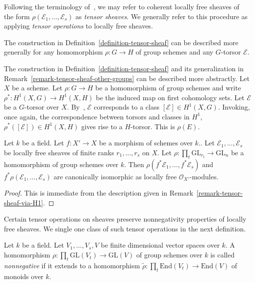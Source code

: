 Following the terminology of~\cite[p.76]{hartshorne_ample_vb}, we may refer to
coherent locally free sheaves of the form
$\rho(\mathcal{E}_1,\ldots,\mathcal{E}_s)$ as \emph{tensor sheaves}.
We generally refer to this procedure as applying \emph{tensor operations}
to locally free sheaves.

\begin{remark}
\label{remark-tensor-sheaf-other-groups}
The construction in Definition~\ref{definition-tensor-sheaf} can be described
more generally for any homomorphism $\rho : G \to H$ of group schemes
and any $G$-torsor $\mathcal{E}$.
\end{remark}

\begin{remark}
\label{remark-tensor-sheaf-via-H1}
The construction in Definition~\ref{definition-tensor-sheaf} and its
generalization in Remark~\ref{remark-tensor-sheaf-other-groups} can be described
more abstractly.
Let $X$ be a scheme.
Let $\rho : G \to H$ be a homomorphism of group schemes
and write $\rho^* : H^1(X,G) \to H^1(X,H)$ be the induced map on first
cohomology sets.
Let $\mathcal{E}$ be a $G$-torsor over $X$.
By~, $\mathcal{E}$ corresponds to a class $[\mathcal{E}] \in H^1(X,G)$.
Invoking, once again, the correspondence between torsors and classes in $H^1$,
$\rho^*([\mathcal{E}]) \in H^1(X,H)$ gives rise to a $H$-torsor.
This is $\rho(E)$.
\end{remark}

\begin{lemma}
\label{lemma-pullback-tensor-sheaves}
Let $k$ be a field.
Let $f: X' \to X$ be a morphism of schemes over $k$..
Let $\mathcal{E}_1,\ldots,\mathcal{E}_s$ be locally free sheaves of finite
ranks $r_1,\ldots,r_s$ on $X$.
Let $\rho : \prod_t \mathrm{GL}_{r_t} \to \mathrm{GL}_n$ be a homomorphism of
group schemes over $k$.
Then $\rho(f^*\mathcal{E}_1,\ldots,f^*\mathcal{E}_s)$ and
$f^*\rho(\mathcal{E}_1,\ldots,\mathcal{E}_s)$ are canonically isomorphic as
locally free $\mathcal{O}_{X'}$-modules.
\end{lemma}

\begin{proof}
This is immediate from the description given in
Remark~\ref{remark-tensor-sheaf-via-H1}.
\end{proof}

Certain tensor operations on sheaves preserve nonnegativity properties of
locally free sheaves.
We single one class of such tensor operations in the next definition.

\begin{definition}
\label{definition-nonneg-rep}
Let $k$ be a field.
Let $V_1,\ldots,V_s,V$ be finite dimensional vector spaces over $k$.
A homomorphism $\rho : \prod_t \mathrm{GL}(V_t) \to \mathrm{GL}(V)$ of group
schemes over $k$ is called \textit{nonnegative} if it extends to a homomorphism
$\tilde{\rho} : \prod_t \mathrm{End}(V_t) \to \mathrm{End}(V)$ of monoids
over $k$.
\end{definition}

